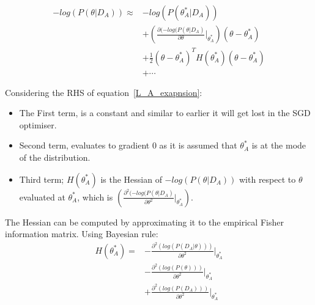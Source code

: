 \begin{equation} \label{L_A_exapnsion}
\begin{split}
    -log(P(\theta|D_A)) \approx & -log(P(\theta^*_A|D_A)) 
    \\
    & + (\frac{\partial(-log(P(\theta|D_A)}{\partial \theta}\vert_{\theta^*_A})(\theta - \theta^*_A) 
    \\
    & + \frac{1}{2}(\theta - \theta^*_A)^{T} H(\theta^*_A)(\theta - \theta^*_A) 
    \\
    & + \cdots
\end{split}
\end{equation}

\noindent Considering the RHS of equation~\ref{L_A_exapnsion}:
\begin{itemize}
    \item The First term, is a constant and similar to earlier it will get lost in the SGD optimiser.  
%
    \item Second term, evaluates to gradient 0 as it is assumed that $\theta^*_A$ is at the mode of the distribution. 
%
    \item  Third term; $H(\theta^{*}_{A})$ is the Hessian of $-log(P(\theta|D_A))$ with respect to $\theta$ evaluated at $\theta^*_A$, which is $(\frac{\partial^2(-log(P(\theta|D_A)}{\partial \theta^2}\vert_{\theta^*_A})$.  
\end{itemize}

The Hessian can be computed by approximating it to the empirical Fisher information matrix.
%
Using Bayesian rule: 
\begin{equation} \label{Bayesian_Approximation_To_Gaussian}
\begin{split}
    H(\theta^*_A) = &-\frac{\partial^2(log(P(D_A|\theta)))}{\partial\theta^2}\Bigg|_{\theta^*_A}
    \\
    & - \frac{\partial^2(log(P(\theta)))}{\partial\theta^2}\Bigg|_{\theta^*_A} 
    \\
    & + \frac{\partial^2(log(P(D_A)))}{\partial\theta^2}\Bigg|_{\theta^*_A}
\end{split}
\end{equation}


